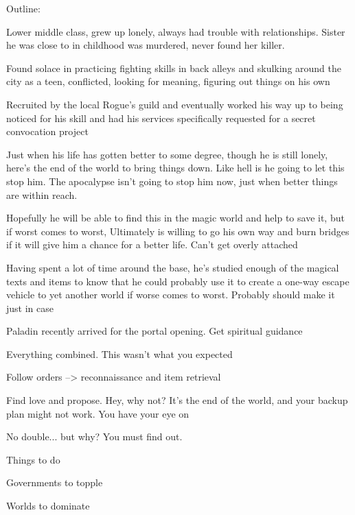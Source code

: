 \documentclass[char]{guildcamp3}
\begin{document}
\name{\cRogueOne{}}




Outline:

Lower middle class, grew up lonely, always had trouble with relationships. Sister he was close to in childhood was murdered, never found her killer.

Found solace in practicing fighting skills in back alleys and skulking around the city as a teen, conflicted, looking for meaning, figuring out things on his own

Recruited by the local Rogue's guild and eventually worked his way up to being noticed for his skill and had his services specifically requested for a secret convocation project

Just when his life has gotten better to some degree, though he is still lonely, here's the end of the world to bring things down. Like hell is he going to let this stop him. The apocalypse isn't going to stop him now, just when better things are within reach. 

Hopefully he will be able to find this in the magic world and help to save it, but if worst comes to worst, Ultimately is willing to go his own way and burn bridges if it will give him a chance for a better life. Can't get overly attached

Having spent a lot of time around the base, he's studied enough of the magical texts and items to know that he could probably use it to create a one-way escape vehicle to yet another world if worse comes to worst. Probably should make it just in case

Paladin recently arrived for the portal opening. Get spiritual guidance

Everything combined. This wasn't what you expected

Follow orders --> reconnaissance and item retrieval

Find love and propose. Hey, why not? It's the end of the world, and your backup plan might not work. You have your eye on \cPoliOne{}

No double... but why? You must find out.

\begin{itemz}[Goals]
  \item Things to do
  \item Governments to topple
  \item Worlds to dominate
\end{itemz}
\end{document}
